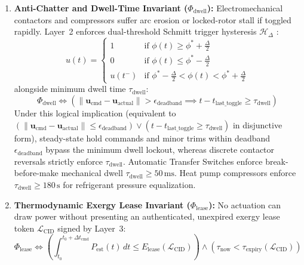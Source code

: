 \begin{enumerate}
    \item \textbf{Anti-Chatter and Dwell-Time Invariant ($\Phi_{\mathrm{dwell}}$):} Electromechanical contactors and compressors suffer arc erosion or locked-rotor stall if toggled rapidly. Layer~2 enforces dual-threshold Schmitt trigger hysteresis $\mathcal{H}_\Delta$ \parencite{astrom2008feedback}:
    \begin{equation}
    u(t) = \left\{ \begin{array}{ll} 
    1 & \mbox{if } \phi(t) \ge \phi^* + \frac{\Delta}{2} \\ 
    0 & \mbox{if } \phi(t) \le \phi^* - \frac{\Delta}{2} \\ 
    u(t^-) & \mbox{if } \phi^* - \frac{\Delta}{2} < \phi(t) < \phi^* + \frac{\Delta}{2} 
    \end{array} \right.
    \label{eq:l2_schmitt_hysteresis}
    \end{equation}
    alongside minimum dwell time $\tau_{\mathrm{dwell}}$:
    \begin{equation}
    \Phi_{\mathrm{dwell}} \iff \left( \|\mathbf{u}_{\mathrm{cmd}} - \mathbf{u}_{\mathrm{actual}}\| > \epsilon_{\mathrm{deadband}} \implies t - t_{\mathrm{last\_toggle}} \ge \tau_{\mathrm{dwell}} \right)
    \label{eq:l2_phi_dwell}
    \end{equation}
    Under this logical implication (equivalent to $(\|\mathbf{u}_{\mathrm{cmd}} - \mathbf{u}_{\mathrm{actual}}\| \le \epsilon_{\mathrm{deadband}}) \lor (t - t_{\mathrm{last\_toggle}} \ge \tau_{\mathrm{dwell}})$ in disjunctive form), steady-state hold commands and minor trims within deadband $\epsilon_{\mathrm{deadband}}$ bypass the minimum dwell lockout, whereas discrete contactor reversals strictly enforce $\tau_{\mathrm{dwell}}$. Automatic Transfer Switches enforce break-before-make mechanical dwell $\tau_{\mathrm{dwell}} \ge 50\,\mathrm{ms}$. Heat pump compressors enforce $\tau_{\mathrm{dwell}} \ge 180\,\mathrm{s}$ for refrigerant pressure equalization.
    
    \item \textbf{Thermodynamic Exergy Lease Invariant ($\Phi_{\mathrm{lease}}$):} No actuation can draw power without presenting an authenticated, unexpired exergy lease token $\mathcal{L}_{\mathrm{CID}}$ signed by Layer~3:
    \begin{equation}
    \Phi_{\mathrm{lease}} \iff \left(\int_{t_0}^{t_0 + \Delta t_{\mathrm{cmd}}} P_{\mathrm{est}}(t) \, dt \le E_{\mathrm{lease}}(\mathcal{L}_{\mathrm{CID}})\right) \land (\tau_{\mathrm{now}} < \tau_{\mathrm{expiry}}(\mathcal{L}_{\mathrm{CID}}))
    \label{eq:l2_phi_lease}
    \end{equation}
    

\end{enumerate}

